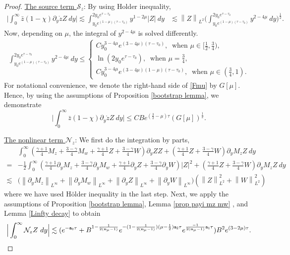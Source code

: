 \documentclass{article}
\newcommand{\norm}[1]{\left\lVert#1\right\rVert}
\newcommand{\ga}{\gamma}
\newcommand{\pa}{\partial}
\def\be{\begin{equation}}
\def\ee{\end{equation}}
\def\beqa{\begin{equation}\begin{aligned}}
\def\eeqa{\end{aligned}\end{equation}}
\def\espz{Z}
\def\espw{W}
\def\mz{M_z}
\def\mw{M_w}
\def\nz{\mathcal N_z}
\def\epone{\mathtt{a_1}}
\def\eptwo{\mathtt{a_2}}
\def\epzero{\mathtt{a_0}}
\def\ndmu{{\bf{n}_{\mu}}}
\numberwithin{equation}{section}
\begin{document}
\begin{proof}
        \noindent\underline{The source term $\mathcal S_z$}: By using Holder inequality,  
        \begin{align*}
          \Big|  \int_0^\infty \bar z (1-\chi) \pa_y \mathring z \espz \ dy \Big| \lesssim \int_{y_0e^{(1-\mu)(\tau-\tau_0)}}^{2y_0e^{\tau-\tau_0}}y^{1-2\mu} |Z| \ dy &\lesssim \norm{\espz}_{L^2} \big(\int_{y_0e^{(1-\mu)(\tau-\tau_0)}}^{2y_0e^{\tau-\tau_0}} y^{2-4\mu} \ dy\big)^{\frac12}.
        \end{align*}
        Now, depending on $\mu$, the integral of $y^{2-4\mu}$ is solved differently. 
        \beqa\label{Fmu}
            \int_{y_0e^{(1-\mu)(\tau-\tau_0)}}^{2y_0e^{\tau-\tau_0}} y^{2-4\mu} \ dy \leq \begin{cases}
                Cy_0^{3-4\mu} e^{(3-4\mu)(\tau-\tau_0)}, \ \text{ when }\mu\in[\frac12,\frac34),\\
                \ln(2y_0e^{\tau-\tau_0}),  \ \text{ when }\mu=\frac34,\\
                Cy_0^{3-4\mu}e^{(3-4\mu)(1-\mu)(\tau-\tau_0)}, \ \text{ when }\mu\in(\frac34,1).
            \end{cases}
        \eeqa
        For notational convenience, we denote the right-hand side of \eqref{Fmu} by $G[\mu]$. Hence, by using the assumptions of Proposition \ref{bootstrap lemma}, we demonstrate
        \be\label{L2 Sz}
            \Big| \int_0^\infty \bar z (1-\chi) \pa_y \mathring z \espz \ dy \Big| \leq CBe^{(\frac{3}{2}-\mu)\tau} (G[\mu])^{\frac12}.
        \ee
        
       \noindent \underline{The nonlinear term $\nz$}:
        We first do the integration by parts, 
        \begin{align*}
           & \int_0^\infty  (\frac{\ga+1}{4}\mz+\frac{3-\ga}{4}\mw+\frac{\ga+1}{4}\espz+\frac{3-\ga}{4}\espw)\partial_y\espz \espz+(\frac{\ga+1}{4}\espz+\frac{3-\ga}{4} \espw)\pa_y\mz \espz \ dy \\
          =&-\frac12\int_0^\infty  (\frac{\ga+1}{4}\pa_y\mz+\frac{3-\ga}{4}\pa_y\mw+\frac{\ga+1}{4}\pa_y\espz+\frac{3-\ga}{4}\pa_y\espw)\left| \espz\right|^2+(\frac{\ga+1}{4}\espz+\frac{3-\ga}{4} \espw)\pa_y\mz \espz \ dy \\
          \lesssim & \Big(\norm{\pa_y\mz}_{L^\infty}+\norm{\pa_y\mw}_{L^\infty}+\norm{\pa_y\espz}_{L^\infty}+\norm{\pa_y\espw}_{L^\infty}\Big)(\norm{\espz}_{L^2}^2 +\norm{\espw}_{L^2}^2 )
        \end{align*}
        where we have used H\"{o}lder inequality in the last step. Next, we apply the assumptions of Proposition \ref{bootstrap lemma}, Lemma \ref{prop payi mz mw} , and Lemma \ref{Linfty decay} to obtain
        \be\label{L2 Nz}
            \Big| \int_0^\infty \nz \espz \ dy \Big| \lesssim (e^{-\epzero \tau}+B^{1-\frac{1}{2(\ndmu-1)}} e^{-(1-\frac{1}{2(\ndmu-1)})(\mu-\frac12)\eptwo \tau}e^{\frac{-1}{2(\ndmu-1)}\epone\tau})B^2 e^{(3-2\mu)\tau}.
        \ee
        

\end{proof}
\end{document}
